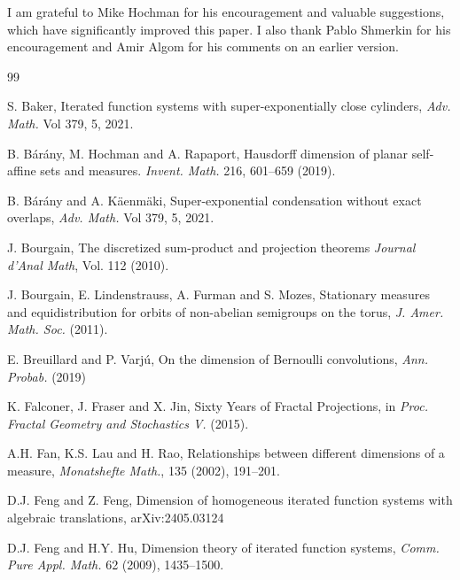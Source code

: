 \documentclass[a4paper,11pt]{amsart}
\theoremstyle{definition}
\numberwithin{equation}{section}
\begin{document}
\medskip

 I am grateful to Mike Hochman for his encouragement and valuable suggestions, which have significantly improved this paper. I also thank Pablo Shmerkin for his encouragement and Amir Algom for his comments on an earlier version.








%

\begin{thebibliography}{99}

 S. Baker,   Iterated function systems with super-exponentially close cylinders,   {\em Adv. Math. } Vol 379, 5, 2021.

B.  B\'ar\'any, M.  Hochman and  A.  Rapaport,  Hausdorff dimension of planar self-affine sets and measures.  {\em Invent. Math.}  216, 601--659 (2019).

 B.  B\'ar\'any  and  A.  K\"aenm\"aki,  Super-exponential condensation without exact overlaps,  {\em Adv. Math. } Vol 379, 5, 2021.

J.  Bourgain, The discretized sum-product and projection theorems
{\em Journal d'Anal Math},  Vol. 112 (2010).

 J.  Bourgain,  E.  Lindenstrauss,   A. Furman and S. Mozes,
Stationary measures and equidistribution for orbits of non-abelian semigroups on the torus,  {\em J. Amer. Math. Soc.} (2011).

  E. Breuillard and P. Varj\'u, On the dimension of Bernoulli convolutions,  {\em Ann.  Probab. }  (2019)


 K. Falconer, J. Fraser and X. Jin,  Sixty Years of Fractal Projections,  in  {\em Proc.  Fractal Geometry and Stochastics V.} (2015).

 A.H.  Fan,  K.S. Lau and H. Rao, Relationships between different dimensions of a measure,  \emph{Monatshefte Math.}, 135 (2002), 191--201.

 D.J.  Feng and Z. Feng,  Dimension of homogeneous iterated function systems with algebraic translations,   arXiv:2405.03124

 D.J.  Feng and H.Y.  Hu,  Dimension theory of iterated function systems,  \emph{Comm.  Pure Appl.  Math. } 62 (2009), 1435--1500.


\end{thebibliography}
\end{document}
